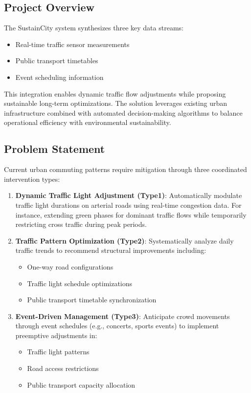 \documentclass[11.5pt]{article}
\begin{document}
    \subsection{Project Overview}
    The SustainCity system synthesizes three key data streams:
    \begin{itemize}
        \item Real-time traffic sensor measurements
        \item Public transport timetables
        \item Event scheduling information
    \end{itemize}
    This integration enables dynamic traffic flow adjustments while proposing sustainable long-term optimizations. The solution leverages existing urban infrastructure combined with automated decision-making algorithms to balance operational efficiency with environmental sustainability.
    
    \subsection{Problem Statement}
    Current urban commuting patterns require mitigation through three coordinated intervention types:
    \begin{enumerate}
        \item \textbf{Dynamic Traffic Light Adjustment (Type1)}: Automatically modulate traffic light durations on arterial roads using real-time congestion data. For instance, extending green phases for dominant traffic flows while temporarily restricting cross traffic during peak periods.
        
        \item \textbf{Traffic Pattern Optimization (Type2)}: Systematically analyze daily traffic trends to recommend structural improvements including:
        \begin{itemize}
            \item One-way road configurations
            \item Traffic light schedule optimizations
            \item Public transport timetable synchronization
        \end{itemize}
        
        \item \textbf{Event-Driven Management (Type3)}: Anticipate crowd movements through event schedules (e.g., concerts, sports events) to implement preemptive adjustments in:
        \begin{itemize}
            \item Traffic light patterns
            \item Road access restrictions
            \item Public transport capacity allocation
        \end{itemize}
    \end{enumerate}
    
\end{document}

